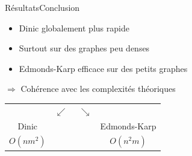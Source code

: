 \begin{frame}{Résultats}{Conclusion}
\begin{itemize}
\item Dinic globalement plus rapide
\item Surtout sur des graphes peu denses
\item Edmonds-Karp efficace sur des petits graphes
\end{itemize}
$\Rightarrow$ Cohérence avec les complexités théoriques
\begin{center}
\begin{tabular}{ccc}
&$\swarrow\ \ \ \ \ \ \searrow$&\\
Dinic&&Edmonds-Karp\\
$O(nm^2)$&&$O(n^2m)$
\end{tabular}
\end{center}
\end{frame}